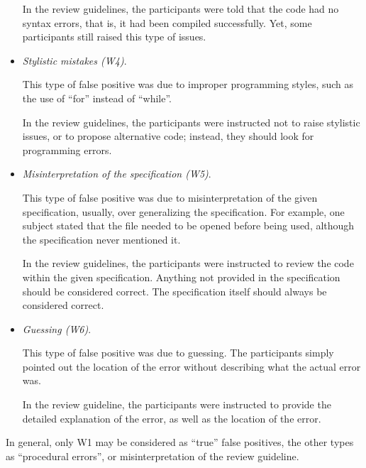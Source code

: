 \begin{itemize}
In the review guidelines, the participants were told that
the code had no syntax errors, that is, it had been compiled
successfully.  Yet, some participants still raised this type
of issues.

\item {\it Stylistic mistakes (W4)}. 

This type of false positive was due to improper programming
styles, such as the use of ``for'' instead of ``while''.

In the review guidelines, the participants were instructed
not to raise stylistic issues, or to propose alternative
code; instead, they should look for programming errors.

\item {\it Misinterpretation of the specification (W5)}. 

This type of false positive was due to misinterpretation of
the given specification, usually, over generalizing the
specification.  For example, one subject stated that the
file needed to be opened before being used, although the
specification never mentioned it.

In the review guidelines, the participants were instructed
to review the code within the given specification. Anything
not provided in the specification should be considered
correct. The specification itself should always be
considered correct.


\item {\it Guessing (W6)}. 

This type of false positive was due to guessing. The
participants simply pointed out the location of the error
without describing what the actual error was.

In the review guideline, the participants were instructed to
provide the detailed explanation of the error, as well as
the location of the error.

\end{itemize}

In general, only W1 may be considered as ``true'' false
positives, the other types as ``procedural errors'', or
misinterpretation of the review guideline.

